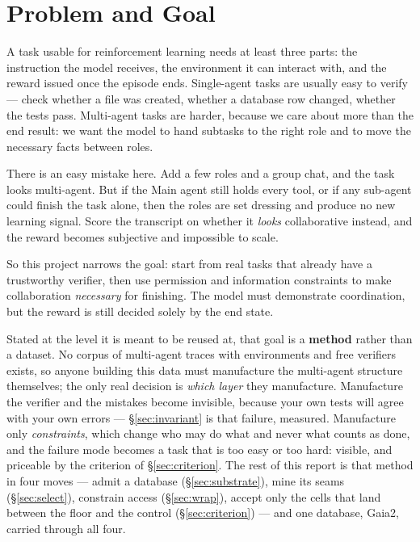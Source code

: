 \documentclass[11pt,a4paper]{article}
\begin{document}
\clearpage
\thispagestyle{empty}
{\setlength{\parskip}{0pt}
\renewcommand{\contentsname}{\normalsize\bfseries Contents}
\tableofcontents}

\clearpage
\hypersetup{pageanchor=true}

\section{Problem and Goal}

A task usable for reinforcement learning needs at least three parts: the instruction the model receives, the environment it can interact with, and the reward issued once the episode ends. Single-agent tasks are usually easy to verify --- check whether a file was created, whether a database row changed, whether the tests pass. Multi-agent tasks are harder, because we care about more than the end result: we want the model to hand subtasks to the right role and to move the necessary facts between roles.

There is an easy mistake here. Add a few roles and a group chat, and the task looks multi-agent. But if the Main agent still holds every tool, or if any sub-agent could finish the task alone, then the roles are set dressing and produce no new learning signal. Score the transcript on whether it \emph{looks} collaborative instead, and the reward becomes subjective and impossible to scale.

So this project narrows the goal: start from real tasks that already have a trustworthy verifier, then use permission and information constraints to make collaboration \emph{necessary} for finishing. The model must demonstrate coordination, but the reward is still decided solely by the end state.

Stated at the level it is meant to be reused at, that goal is a \textbf{method} rather than a dataset. No corpus of multi-agent traces with environments and free verifiers exists, so anyone building this data must manufacture the multi-agent structure themselves; the only real decision is \emph{which layer} they manufacture. Manufacture the verifier and the mistakes become invisible, because your own tests will agree with your own errors --- \S\ref{sec:invariant} is that failure, measured. Manufacture only \emph{constraints}, which change who may do what and never what counts as done, and the failure mode becomes a task that is too easy or too hard: visible, and priceable by the criterion of \S\ref{sec:criterion}. The rest of this report is that method in four moves --- admit a database (\S\ref{sec:substrate}), mine its seams (\S\ref{sec:select}), constrain access (\S\ref{sec:wrap}), accept only the cells that land between the floor and the control (\S\ref{sec:criterion}) --- and one database, Gaia2, carried through all four.
\end{document}
